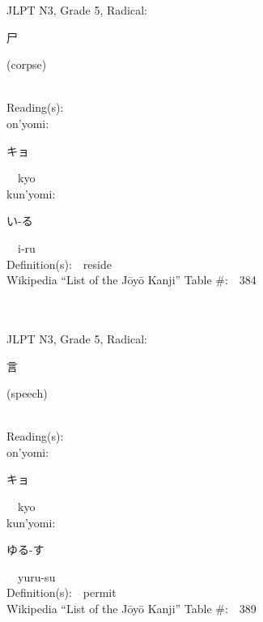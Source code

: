 \begin{multicols}{2}
{JLPT N3, Grade 5, Radical:\ \ {\begin{CJK}{UTF8}{min} 尸 \end{CJK}} (corpse) } \\
Reading(s):\ \ \\
{\hspace*{1em}}on'yomi:\ \ \\
{\hspace*{2em}}{\begin{CJK}{UTF8}{min} キョ \end{CJK}}\ \ kyo\ \ \\
{\hspace*{1em}}kun'yomi:\ \ \\
{\hspace*{2em}}{\begin{CJK}{UTF8}{min} い-る \end{CJK}}\ \ i-ru\ \ \\
Definition(s):\ \ reside \\
Wikipedia ``List of the J\=oy\=o Kanji'' Table \#:\ \ 384 \\
\ \ \\
{\fontsize{34pt}{40pt}  }\ \ \\  %
{JLPT N3, Grade 5, Radical:\ \ {\begin{CJK}{UTF8}{min} 言 \end{CJK}} (speech) } \\
Reading(s):\ \ \\
{\hspace*{1em}}on'yomi:\ \ \\
{\hspace*{2em}}{\begin{CJK}{UTF8}{min} キョ \end{CJK}}\ \ kyo\ \ \\
{\hspace*{1em}}kun'yomi:\ \ \\
{\hspace*{2em}}{\begin{CJK}{UTF8}{min} ゆる-す \end{CJK}}\ \ yuru-su\ \ \\
Definition(s):\ \ permit \\
Wikipedia ``List of the J\=oy\=o Kanji'' Table \#:\ \ 389 \\
\ \ \\
{\fontsize{34pt}{40pt}  }\ \ \\  %

\end{multicols}
